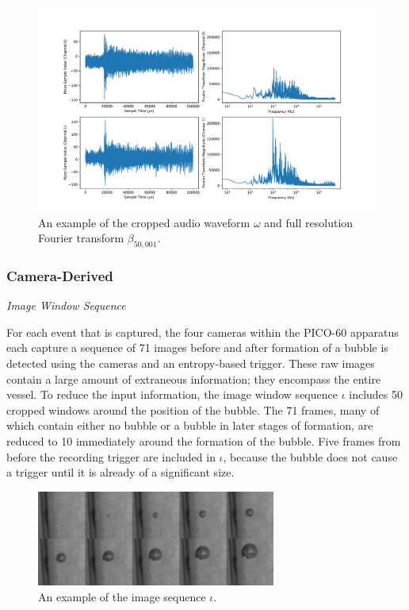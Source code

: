 \documentclass[10pt]{article}
\begin{document}
\begin{figure}[h]
    \centering
    \includegraphics[width=\textwidth]{audio}
    \caption{\label{} An example of the cropped audio waveform $\omega$ and full resolution Fourier transform $\beta_{50,001}$.}
\end{figure}

\subsubsection{Camera-Derived}

\textit{Image Window Sequence}

For each event that is captured, the four cameras within the PICO-60 apparatus each capture a sequence of 71 images before and after formation of a bubble is detected using the cameras and an entropy-based trigger. These raw images contain a large amount of extraneous information; they encompass the entire vessel. To reduce the input information, the image window sequence $\iota$ includes 50 cropped windows around the position of the bubble. The 71 frames, many of which contain either no bubble or a bubble in later stages of formation, are reduced to 10 immediately around the formation of the bubble. Five frames from before the recording trigger are included in $\iota$, because the bubble does not cause a trigger until it is already of a significant size.

\begin{figure}[h]
    \centering
    \includegraphics[width=0.7\textwidth]{image_grid}
    \caption{\label{} An example of the image sequence $\iota$.}
\end{figure}
\end{document}
